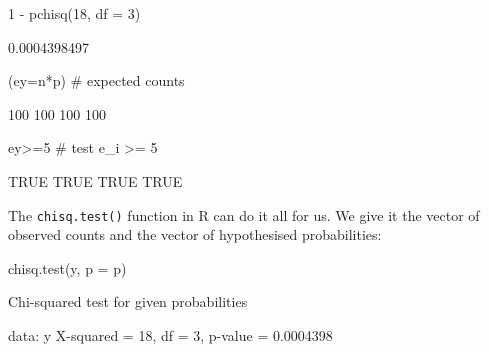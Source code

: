 \documentclass[a4paper]{article}\usepackage[]{graphicx}\usepackage[]{xcolor}
\begin{document}
\begin{Schunk}
\begin{Sinput}
1 - pchisq(18, df = 3)
\end{Sinput}
\begin{Soutput}
[1] 0.0004398497
\end{Soutput}
\begin{Sinput}
(ey=n*p) # expected counts
\end{Sinput}
\begin{Soutput}
[1] 100 100 100 100
\end{Soutput}
\begin{Sinput}
ey>=5 # test e_i >= 5
\end{Sinput}
\begin{Soutput}
[1] TRUE TRUE TRUE TRUE
\end{Soutput}
\end{Schunk}
The \lstinline|chisq.test()| function in R can do it all for us. We give it the vector of observed counts and the vector of hypothesised probabilities:
\begin{Schunk}
\begin{Sinput}
chisq.test(y, p = p)
\end{Sinput}
\begin{Soutput}

	Chi-squared test for given probabilities

data:  y
X-squared = 18, df = 3, p-value = 0.0004398
\end{Soutput}
\end{Schunk}
\end{document}
